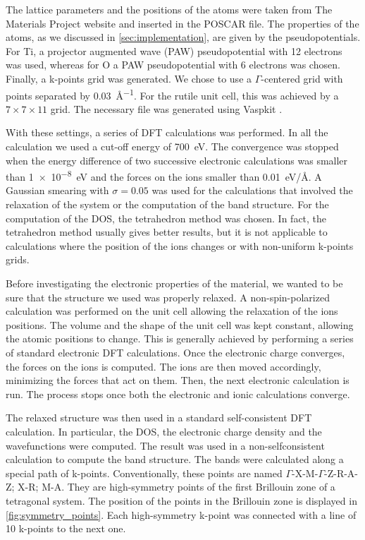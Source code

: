 The lattice parameters and the positions of the atoms were taken from The Materials Project website \cite{osti_1184648} and inserted in the  POSCAR file. The properties of the atoms, as we discussed in \cref{sec:implementation}, are given by the pseudopotentials. For Ti, a projector augmented wave (PAW) pseudopotential with 12 electrons was used, whereas for O a PAW pseudopotential with 6 electrons was chosen. Finally, a k-points grid was generated. We chose to use a $\Gamma$-centered grid with points separated by \SI{0.03}{\angstrom^{-1}}. For the rutile unit cell, this was achieved by a
$7\times7\times11$ grid. The necessary file was generated using Vaspkit \cite{VASPKIT}.

With these settings, a series of DFT calculations was performed. In all the calculation we used a cut-off energy of \SI{700}{eV}. The convergence was stopped when the energy difference of two successive electronic calculations was smaller than \SI{1e-8}{eV} and the forces on the ions smaller than \SI{0.01}{eV/\angstrom}. A Gaussian smearing with $\sigma = 0.05$ was used for the calculations that involved the relaxation of the system or the computation of the band structure. For the computation of the DOS, the tetrahedron method was chosen. In fact, the tetrahedron method usually gives better results, but it is not applicable to calculations where the position of the ions changes or with non-uniform k-points grids.

Before investigating the electronic properties of the material, we wanted to be sure that the structure we used was properly relaxed. A non-spin-polarized calculation was performed on the unit cell allowing the relaxation of the ions positions. The volume and the shape of the unit cell was kept constant, allowing the atomic positions to change. This is generally achieved by performing a series of standard electronic DFT calculations. Once the electronic charge converges, the forces on the ions is computed. The ions are then moved accordingly, minimizing the forces that act on them. Then, the next electronic calculation is run. The process stops once both the electronic and ionic calculations converge.

The relaxed structure was then used in a standard self-consistent DFT calculation. In particular, the DOS, the electronic charge density and the wavefunctions were computed. The result was used in a non-selfconsistent calculation to compute the band structure. The bands were calculated along a special path of k-points. Conventionally, these points are named  $\Gamma$-X-M-$\Gamma$-Z-R-A-Z; X-R; M-A. They are high-symmetry points of the first Brillouin zone of a tetragonal system. The position of the points in the Brillouin zone is displayed in \cref{fig:symmetry_points}. Each high-symmetry k-point was connected with a line of 10 k-points to the next one.

